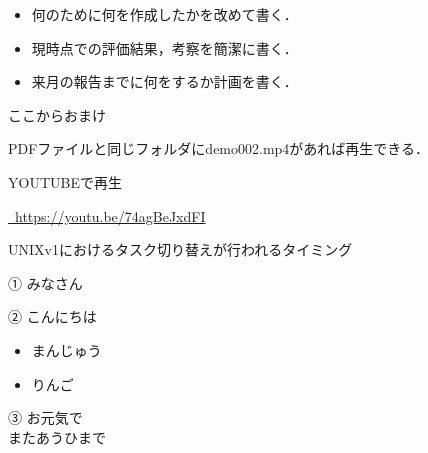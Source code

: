 \label{MUSUBI}
\begin{itemize}
	\item 何のために何を作成したかを改めて書く．
	\item 現時点での評価結果，考察を簡潔に書く．
	\item 来月の報告までに何をするか計画を書く．
\end{itemize}
\newpage

ここからおまけ

\href{run:./demo002.mp4}{\textcolor[hsb]{0.0, 0.7, 1.0}{\faPlayCircle[regular]}} PDFファイルと同じフォルダにdemo002.mp4があれば再生できる．


\href{https://youtu.be/74agBeJxdFI}{\textcolor{red}{\faYoutube}} YOUTUBEで再生

\textcolor{red}{\faYoutube}\href{https://youtu.be/74agBeJxdFI}{~\url{https://youtu.be/74agBeJxdFI}}




UNIXv1におけるタスク切り替えが行われるタイミング

\colorbox{mygray}{\begin{minipage}{\textwidth}
① みなさん
\end{minipage}}

\colorbox{mygray}{\begin{minipage}{\textwidth}
② こんにちは 
\begin{itemize}
\item まんじゅう
\item りんご
\end{itemize}
\end{minipage}}

\colorbox{mypink1}{\begin{minipage}{\textwidth}
③ お元気で\\
またあうひまで
\end{minipage}}

